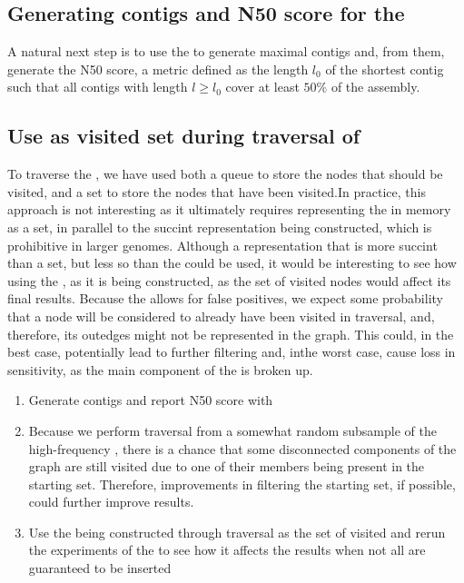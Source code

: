 \subsection{Generating contigs and N50 score for the \dBHT}

A natural next step is to use the \dBHT to generate maximal contigs and, from them, generate the N50 score, a metric defined as the length $l_0$ of the shortest contig such that all contigs with length $l \geq l_0$ cover at least $50\%$ of the assembly.

\subsection{Use \dBHT as visited set during traversal of \dBCM}

To traverse the \dBCM, we have used both a queue to store the nodes that should be visited, and a set to store the nodes that have been visited.In practice, this approach is not interesting as it ultimately requires representing the \dBG in memory as a set, in parallel to the succint representation being constructed, which is prohibitive in larger genomes. Although a representation that is more succint than a set, but less so than the \dBHT could be used, it would be interesting to see how using the \dBHT, as it is being constructed, as the set of visited nodes would affect its final results. Because the \dBHT allows for false positives, we expect some probability that a node will be considered to already have been visited in traversal, and, therefore, its outedges might not be represented in the graph. This could, in the best case, potentially lead to further filtering and, inthe worst case, cause loss in sensitivity, as the main component of the \dBG is broken up.

\begin{enumerate}
\item Generate contigs and report N50 score with \dBHT
\item Because we perform traversal from a somewhat random subsample of the high-frequency , there is a chance that some disconnected components of the graph are still visited due to one of their members being present in the starting set. Therefore, improvements in filtering the starting set, if possible, could further improve results.
\item Use the \dBHT being constructed through traversal as the set of visited  and rerun the experiments of the \dBHT to see how it affects the results when not all  are guaranteed to be inserted
\end{enumerate}